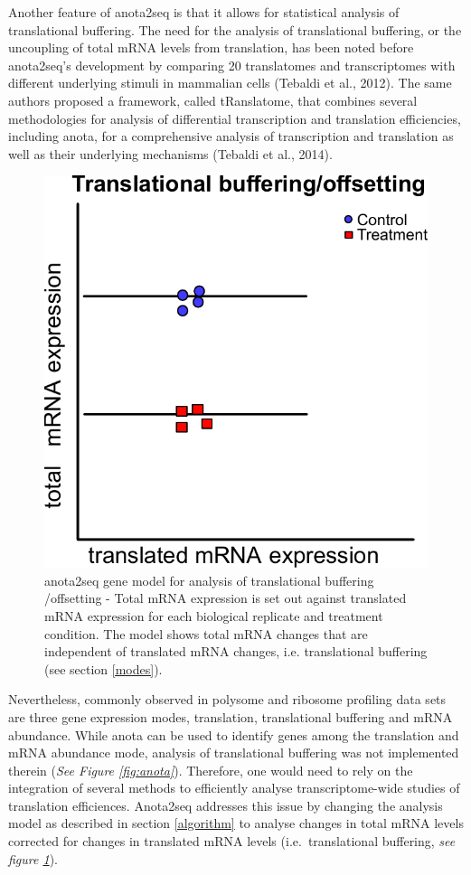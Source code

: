 \documentclass[12pt,openany]{book}
\begin{document}
Another feature of anota2seq is that it allows for statistical analysis
of translational buffering. The need for the analysis of translational
buffering, or the uncoupling of total mRNA levels from translation, has
been noted before anota2seq's development by comparing 20 translatomes
and transcriptomes with different underlying stimuli in mammalian cells
(Tebaldi et al., 2012). The same authors proposed a framework, called
tRanslatome, that combines several methodologies for analysis of
differential transcription and translation efficiencies, including
anota, for a comprehensive analysis of transcription and translation as
well as their underlying mechanisms (Tebaldi et al., 2014).

\begin{figure}
  \includegraphics{./figures/geneModes_anota2seq.pdf}
  \caption{anota2seq gene model for analysis of translational buffering /offsetting - Total mRNA expression is set out against translated mRNA expression for each biological replicate and treatment condition. The model shows total mRNA changes that are independent of translated mRNA changes, i.e. translational buffering (see section \ref{modes}).
  \label{fig:anota2seq}}
\end{figure}

Nevertheless, commonly observed in polysome and ribosome profiling data
sets are three gene expression modes, translation, translational
buffering and mRNA abundance. While anota can be used to identify genes
among the translation and mRNA abundance mode, analysis of translational
buffering was not implemented therein (\emph{See Figure
\ref{fig:anota}}). Therefore, one would need to rely on the integration
of several methods to efficiently analyse transcriptome-wide studies of
translation efficiences. Anota2seq addresses this issue by changing the
analysis model as described in section \ref{algorithm} to analyse
changes in total mRNA levels corrected for changes in translated mRNA
levels (i.e.~translational buffering, \emph{see figure
\ref{fig:anota2seq}}).
\end{document}
